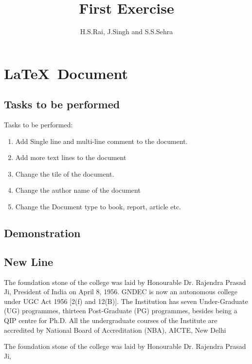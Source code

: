 \documentclass[12pt, letterpaper, twoside]{book}
\title{First Exercise}
\author{H.S.Rai, J.Singh and S.S.Sehra}
\begin{document}
\maketitle
\chapter{\LaTeX\ Document}
\section*{Tasks to be performed}
Tasks to be performed:
\begin{enumerate}
	\item Add Single line and multi-line comment to the document.
    \item Add more text lines to the document
    \item Change the tile of the document.
   \item Change the author name of the document
   \item Change the Document type to book, report, article etc.
\end{enumerate}
\section*{Demonstration}

\section{New Line}
The foundation stone of the college was laid by Honourable Dr. Rajendra Prasad Ji, President of India on April 8, 1956. GNDEC is now an autonomous college under UGC Act 1956 [2(f) and 12(B)]. The Institution has seven Under-Graduate (UG) programmes, thirteen Post-Graduate (PG) programmes, besides being a QIP centre for Ph.D. All the undergraduate courses of the Institute are accredited by  National Board of Accreditation (NBA), AICTE, New Delhi

The foundation stone of the college was laid by Honourable Dr. Rajendra Prasad Ji,
\end{document}

